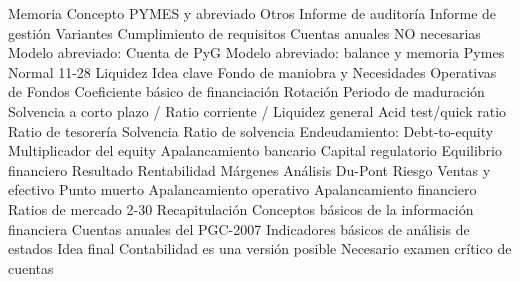 \documentclass{nuevotema}
\begin{document}
\begin{esquema}[enumerate]
		\2[V] Memoria
			\3 Concepto
			\3 PYMES y abreviado
		\2 Otros
			\3 Informe de auditoría
			\3 Informe de gestión
		\2 Variantes
			\3 Cumplimiento de requisitos
			\3 Cuentas anuales NO necesarias
			\3 Modelo abreviado: Cuenta de PyG
			\3 Modelo abreviado: balance y memoria
			\3 Pymes
			\3 Normal
	\1  11-28
		\2 Liquidez
			\3 Idea clave
			\3 Fondo de maniobra y Necesidades Operativas de Fondos
			\3 Coeficiente básico de financiación
			\3 Rotación
			\3 Periodo de maduración
			\3 Solvencia a corto plazo / Ratio corriente / Liquidez general
			\3 Acid test/quick ratio
			\3 Ratio de tesorería
		\2 Solvencia
			\3 Ratio de solvencia
			\3 Endeudamiento:
			\3 Debt-to-equity
			\3 Multiplicador del equity
			\3 Apalancamiento bancario
			\3 Capital regulatorio
			\3 Equilibrio financiero
		\2 Resultado
			\3 Rentabilidad
			\3 Márgenes
			\3 Análisis Du-Pont
			\3 Riesgo
			\3 Ventas y efectivo
			\3 Punto muerto
			\3 Apalancamiento operativo
			\3 Apalancamiento financiero
			\3 Ratios de mercado
	\1[]  2-30
		\2 Recapitulación
			\3 Conceptos básicos de la información financiera
			\3 Cuentas anuales del PGC-2007
			\3 Indicadores básicos de análisis de estados
		\2 Idea final
			\3 Contabilidad es una versión posible
			\3 Necesario examen crítico de cuentas

\end{esquema}

\esquemalargo
\end{document}
